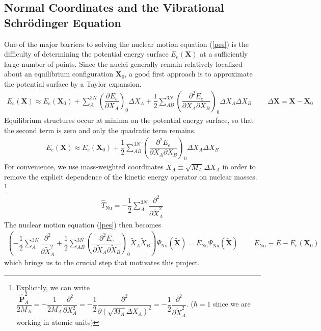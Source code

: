 \documentclass[11pt]{article}
\newcommand{\bo}[1]{\ensuremath{\mathbf{#1}}}
\renewcommand{\sp}{\ \ \ \ \ \ \ \ \ \ }
\newcommand{\pt}{\partial}
\newcommand{\fr}[2]{\dfrac{#1}{#2}}
\newcommand{\pr}[1]{\left(#1\right)}
\newcommand{\pd}[3]{\ensuremath{ \dfrac{ \partial^{#1} #2 }{\partial #3 ^{#1}}}}
\newcommand{\Nu}{\ensuremath{\mathrm{Nu}}}
\newcommand{\op}[1]{\ensuremath{\hat{#1}}}
\newcommand{\Y}{\ensuremath{\Psi}}
\newcommand{\D}{\ensuremath{\Delta}}
\newcommand{\tl}[1]{\ensuremath{\tilde{#1}}}
\begin{document}
\subsection{Normal Coordinates and the Vibrational Schr\"odinger Equation}
One of the major barriers to solving the nuclear motion equation (\ref{pes}) is the difficulty of determining the potential energy surface $E_e(\bo{X})$ at a sufficiently large number of points.
Since the nuclei generally remain relatively localized about an equilibrium configuration $\bo{X}_0$, a good first approach is to approximate the potential surface by a Taylor expansion.
\begin{align*}
	E_e(\bo{X})
\approx
	E_e(\bo{X}_0)
+\sum_A^{3N}
	\pr{\pd{}{E_e}{X_A}}_0
	\D X_A
+\fr{1}{2}\sum_{AB}^{3N}
	\pr{\fr{\pt^2E_e}{\pt X_A\pt X_B}}_0
	\D X_A
	\D X_B
	\sp \D\bo{X}=\bo{X}-\bo{X}_0
\end{align*}
Equilibrium structures occur at minima on the potential energy surface, so that the second term is zero and only the quadratic term remains.
\begin{align}
	E_e(\bo{X})
\approx
	E_e(\bo{X}_0)
+\fr{1}{2}\sum_{AB}^{3N}
	\pr{\fr{\pt^2E_e}{\pt X_A\pt X_B}}_0
	\D X_A
	\D X_B
\end{align}
For convenience, we use mass-weighted coordinates $\tl{X}_A \equiv \sqrt{M_A}\D X_A$
in order to remove the explicit dependence of the kinetic energy operator on nuclear masses. \footnote{Explicitly, we can write $\fr{\op{\bo{P}}_A^2}{2M_A} = -\fr{1}{2M_A} \pd{2}{}{X_A}=-\fr{1}{2}\pd{2}{}{(\sqrt{M_A}\D X_A)}=-\fr{1}{2}\pd{2}{}{\tl{X}_A}$. ($\hbar=1$ since we are working in atomic units)}
\begin{align}
	\op{T}_\Nu
=
	-\fr{1}{2}\sum_A^{3N} \pd{2}{}{\tl{X}_A}
\end{align}
The nuclear motion equation (\ref{pes}) then becomes
\begin{align}
\label{pes-intermediate}
\pr{
-\fr{1}{2}\sum_A^{3N}
	\pd{2}{}{\tl{X}_A}
+\fr{1}{2}\sum_{AB}^{3N}
	\pr{\fr{\pt^2E_e}{\pt \tl{X}_A\pt \tl{X}_B}}_0
	\tl{X}_A
	\tl{X}_B
}
	\Y_\Nu(\tl{\bo{X}})
=
	E_\Nu
	\Y_\Nu(\tl{\bo{X}})
\sp
	E_\Nu
\equiv
	E - E_e(\bo{X}_0)
\end{align}
which brings us to the crucial step that motivates this project.
\end{document}
